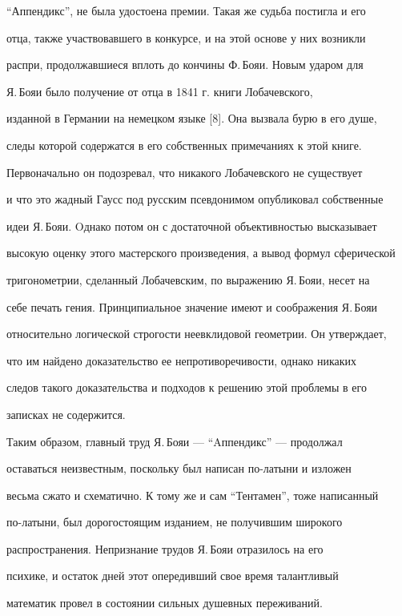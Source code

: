 ``Аппендикс'', не была удостоена премии. Такая же судьба постигла и его 


отца, также участвовавшего в конкурсе, и на этой основе у них возникли 


распри, продолжавшиеся вплоть до кончины Ф.\,Бояи. Новым ударом для 


Я.\,Бояи было получение от отца в 1841 г. книги Лобачевского, 


изданной в Германии на немецком языке [8]. Она вызвала бурю в его душе, 


следы которой содержатся в его собственных примечаниях к этой книге. 


Первоначально он подозревал, что никакого Лобачевского не существует 


и что это жадный Гаусс под русским псевдонимом опубликовал собственные 


идеи Я.\,Бояи. Oднако потом он с достаточной объективностью высказывает 


высокую оценку этого мастерского произведения, а вывод формул сферической 


тригонометрии, сделанный Лобачевским, по выражению Я.\,Бояи, несет на 


себе печать гения. Принципиальное значение имеют и соображения Я.\,Бояи 


относительно логической строгости неевклидовой геометрии. Он утверждает, 


что им найдено доказательство ее непротиворечивости, однако никаких 


следов такого доказательства и подходов к решению этой проблемы в его 


записках не содержится.





Таким образом, главный труд Я.\,Бояи --- ``Aппендикс'' --- продолжал 


оставаться неизвестным, поскольку был написан по-латыни и изложен 


весьма сжато и схематично. К тому же и сам ``Тентамен'', тоже написанный 


по-латыни, был дорогостоящим изданием, не получившим широкого 


распространения. Непризнание трудов Я.\,Бояи отразилось на его


психике, и остаток дней этот опередивший свое время талантливый 


математик провел в состоянии сильных душевных переживаний.





